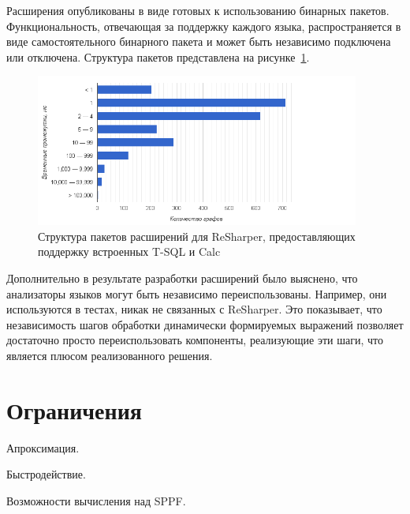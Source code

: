 Расширения опубликованы в виде готовых к использованию бинарных пакетов. Функциональность, отвечающая за поддержку каждого языка, распространяется в виде самостоятельного бинарного пакета и может быть независимо подключена или отключена. Структура пакетов представлена на рисунке~\ref{fig:packagesStructure}.

\begin{figure}[H]
  \centering
 \includegraphics[width=0.95\textwidth]{pics/distr.png}
 \caption{Структура пакетов расширений для ReSharper, предоставляющих поддержку встроенных T-SQL и Calc}
 \label{fig:packagesStructure}
\end{figure}

Дополнительно в результате разработки расширений было выяснено, что анализаторы языков могут быть независимо переиспользованы. Например, они используются в тестах, никак не связанных с ReSharper. Это показывает, что независимость шагов обработки динамически формируемых выражений позволяет достаточно просто переиспользовать компоненты, реализующие эти шаги, что является плюсом реализованного решения.

\section{Ограничения}

Апроксимация.

Быстродействие.

Возможности вычисления над SPPF.
